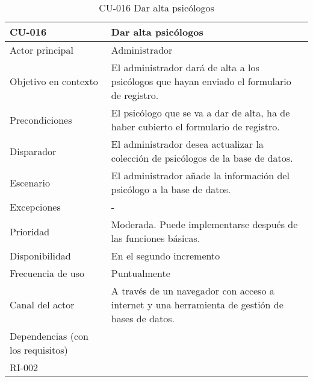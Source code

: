 %
%

\begin{table}[htpb]
\centering
\caption{CU-016 Dar alta psicólogos}                          
\begin{tabularx}{\textwidth}{|X|X|}
\hline
CU-016                            & Dar alta psicólogos                                                                            \\ \hline
Actor principal                   & Administrador                                                                                  \\ \hline
Objetivo en contexto              & El administrador dará de alta a los psicólogos que hayan enviado el formulario de registro.    \\ \hline
Precondiciones                    & El psicólogo que se va a dar de alta, ha de haber cubierto el formulario de registro.          \\ \hline
Disparador                        & El administrador desea actualizar la colección de psicólogos de la base de datos.              \\ \hline
Escenario                         & El administrador añade la información del psicólogo a la base de datos.                        \\ \hline
Excepciones                       & -                                                                                              \\ \hline
Prioridad                         & Moderada. Puede implementarse después de las funciones básicas.                                \\ \hline
Disponibilidad                    & En el segundo incremento                                                                       \\ \hline
Frecuencia de uso                 & Puntualmente                                                                                   \\ \hline
Canal del actor                   & A través de un navegador con acceso a internet y una herramienta de gestión de bases de datos. \\ \hline
Dependencias (con los requisitos) & \begin{tabular}[c]{@{}l@{}}RI-003\\ RI-002\end{tabular}                                        \\ \hline
\end{tabularx}
\end{table}

